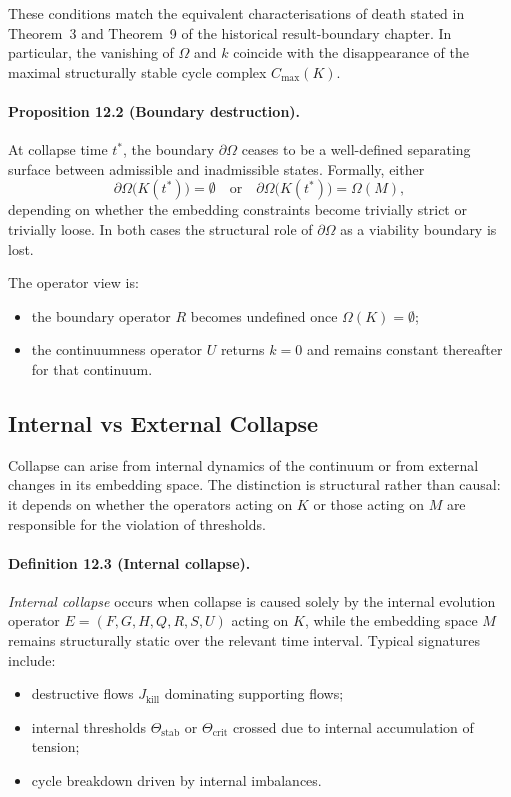 These conditions match the equivalent characterisations of death stated in
Theorem~3 and Theorem~9 of the historical result-boundary chapter.
In particular, the vanishing of \(\Omega\) and \(k\) coincide with the
disappearance of the maximal structurally stable cycle complex
\(C_{\max}(K)\).

\paragraph{Proposition 12.2 (Boundary destruction).}
At collapse time \(t^{\ast}\), the boundary \(\partial\Omega\) ceases to be a
well-defined separating surface between admissible and inadmissible states.
Formally, either
\begin{equation}
  \partial\Omega\big(K(t^{\ast})\big) = \emptyset
  \quad\text{or}\quad
  \partial\Omega\big(K(t^{\ast})\big) = \Omega(M),
\end{equation}
depending on whether the embedding constraints become trivially strict or
trivially loose. In both cases the structural role of \(\partial\Omega\)
as a viability boundary is lost.

The operator view is:
\begin{itemize}
  \item the boundary operator \(R\) becomes undefined once
        \(\Omega(K)=\emptyset\);
  \item the continuumness operator \(U\) returns \(k=0\) and remains
        constant thereafter for that continuum.
\end{itemize}

\subsection{Internal vs External Collapse}

Collapse can arise from internal dynamics of the continuum or from external
changes in its embedding space. The distinction is structural rather than
causal: it depends on whether the operators acting on \(K\) or those acting on
\(M\) are responsible for the violation of thresholds.

\paragraph{Definition 12.3 (Internal collapse).}
\emph{Internal collapse} occurs when collapse is caused solely by the internal
evolution operator \(E=(F,G,H,Q,R,S,U)\) acting on \(K\), while the embedding
space \(M\) remains structurally static over the relevant time interval.
Typical signatures include:
\begin{itemize}
  \item destructive flows \(J_{\mathrm{kill}}\) dominating supporting flows;
  \item internal thresholds \(\Theta_{\mathrm{stab}}\) or
        \(\Theta_{\mathrm{crit}}\) crossed due to internal accumulation of
        tension;
  \item cycle breakdown driven by internal imbalances.
\end{itemize}

